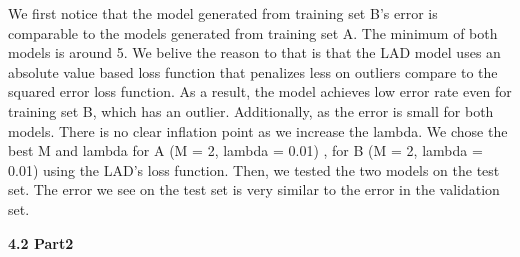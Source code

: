 We first notice that the model generated from training set B's error
is comparable to the models generated from training set A. The minimum of
both models is around 5. We belive the reason to that is that the 
LAD model uses an absolute value based loss function that penalizes less
on outliers compare to the squared error loss function. As a result, the model achieves low error rate even for training set B, which has an outlier. Additionally, as the error is small for both models. There is no clear inflation point as we increase the lambda. We chose the best M and lambda
for A (M = 2, lambda = 0.01) , for B (M = 2, lambda = 0.01) using the LAD's loss function.  Then, we tested the two models on the test set. The error we see on the test set is very similar to the error in the validation set. 


{\bfseries 4.2 Part2}
